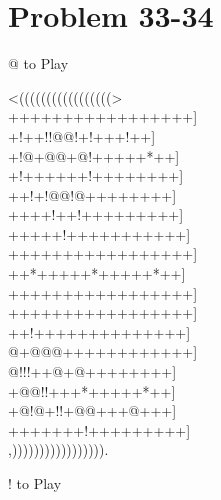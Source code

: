 \documentclass[mcrownvopaper,10pt,onecolumn,final]{memoir}
\begin{document}
\section{Problem 33-34}
\begin{minipage}[c]{0.5\linewidth}
    \hspace{8.3mm} {\gnos%
       @ 
    }
    to Play
\end{minipage}
\begin{minipage}[c]{0.5\linewidth}
    \hspace{27mm}
\end{minipage}
\begin{minipage}[c]{\linewidth}
    \centering
    {\gnos%
          <(((((((((((((((((>\\
    +++++++++++++++++]\\
    +!++!!@@!+!+++!++]\\
    +!@+@@+@!+++++*++]\\
    +!++++++!++++++++]\\
    ++!+!@@!@++++++++]\\
    ++++!++!+++++++++]\\
    +++++!+++++++++++]\\
    +++++++++++++++++]\\
    ++*+++++*+++++*++]\\
    +++++++++++++++++]\\
    +++++++++++++++++]\\
    ++!++++++++++++++]\\
    @+@@@++++++++++++]\\
    @!!!++@+@++++++++]\\
    +@@!!+++*+++++*++]\\
    +@!@+!!+@@+++@+++]\\
    +++++++!+++++++++]\\
          ,))))))))))))))))).\\
    }
\end{minipage}
\begin{minipage}[c]{0.5\linewidth}
    \hspace{8.3mm} {\gnos%
        !
    }
    to Play
\end{minipage}
\begin{minipage}[c]{0.5\linewidth}
    \hspace{27mm}
\end{minipage}
\newpage
\end{document}
